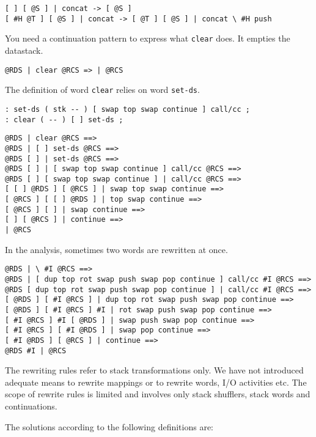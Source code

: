 \begin{verbatim}
[ ] [ @S ] | concat -> [ @S ]
[ #H @T ] [ @S ] | concat -> [ @T ] [ @S ] | concat \ #H push
\end{verbatim}

You need a continuation pattern to express what \verb|clear| does. It empties the datastack.

\begin{verbatim}
@RDS | clear @RCS => | @RCS
\end{verbatim}

The definition of word \verb|clear| relies on word \verb|set-ds|.

\begin{verbatim}
: set-ds ( stk -- ) [ swap top swap continue ] call/cc ;
: clear ( -- ) [ ] set-ds ;
\end{verbatim}

\begin{verbatim}
@RDS | clear @RCS ==>
@RDS | [ ] set-ds @RCS ==>
@RDS [ ] | set-ds @RCS ==>
@RDS [ ] | [ swap top swap continue ] call/cc @RCS ==>
@RDS [ ] [ swap top swap continue ] | call/cc @RCS ==>
[ [ ] @RDS ] [ @RCS ] | swap top swap continue ==>
[ @RCS ] [ [ ] @RDS ] | top swap continue ==>
[ @RCS ] [ ] | swap continue ==>
[ ] [ @RCS ] | continue ==>
| @RCS
\end{verbatim}

In the analysis, sometimes two words are rewritten at once.

\begin{verbatim}
@RDS | \ #I @RCS ==>
@RDS | [ dup top rot swap push swap pop continue ] call/cc #I @RCS ==>
@RDS [ dup top rot swap push swap pop continue ] | call/cc #I @RCS ==>
[ @RDS ] [ #I @RCS ] | dup top rot swap push swap pop continue ==>
[ @RDS ] [ #I @RCS ] #I | rot swap push swap pop continue ==>
[ #I @RCS ] #I [ @RDS ] | swap push swap pop continue ==>
[ #I @RCS ] [ #I @RDS ] | swap pop continue ==>
[ #I @RDS ] [ @RCS ] | continue ==>
@RDS #I | @RCS
\end{verbatim}

The rewriting rules refer to stack transformations only. We have not introduced adequate means to rewrite mappings or to rewrite words, I/O activities etc. The scope of rewrite rules is limited and involves only stack shufflers, stack words and continuations.

The solutions according to the following definitions are:

